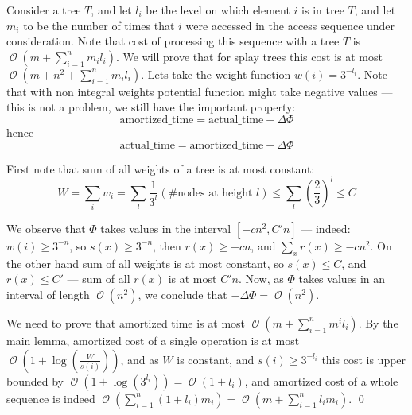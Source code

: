 \documentclass[11pt]{article}
\DeclareMathOperator*{\Oh}{\mathcal{O}}
\begin{document}
Consider a tree $T$, and let $l_i$ be the level on which element $i$ is in tree $T$, and let $m_i$ to be the number of times that $i$ were accessed in the access sequence under consideration.
Note that cost of processing this sequence with a tree $T$ is $\Oh(m + \sum_{i=1}^n m_i l_i)$. We will prove that for splay trees this cost is at most $\Oh(m + n^2 + \sum_{i=1}^n m_i l_i)$. Lets take the weight function $w(i) = 3^{-l_i}$. Note that with non integral weights potential function might take negative values --- this is not a problem, we still have the important property:
\begin{equation*}
\mathrm{amortized\_time} = \mathrm{actual\_time} + \Delta\Phi
\end{equation*}
hence
\begin{equation*}
\mathrm{actual\_time} = \mathrm{amortized\_time} - \Delta\Phi
\end{equation*}

First note that sum of all weights of a tree is at most constant:
\begin{equation*}
	W = \sum_{i} w_i = \sum_{l} \frac{1}{3^l} (\# \text{nodes at height }l) \leq \sum_l \left( \frac{2}{3} \right)^l \leq C
\end{equation*}

We observe that $\Phi$ takes values in the interval $[-c n^2, C' n]$ --- indeed: $w(i) \geq 3^{-n}$, so  $s(x) \geq 3^{-n}$, then $r(x) \geq -c n$, and $\sum_x r(x) \geq -c n^2$. On the other hand sum of all weights is at most constant, so $s(x) \leq C$, and $r(x) \leq C'$ --- sum of all $r(x)$ is at most $C' n$.  Now, as $\Phi$ takes values in an interval of length $\Oh(n^2)$, we conclude that $- \Delta\Phi = \Oh(n^2)$.

We need to prove that amortized time is at most $\Oh(m + \sum_{i=1}^n m^i l_i)$. By the main lemma, amortized cost of a single operation is at most $\Oh(1 + \log(\frac{W}{s(i)}))$, and as $W$ is constant, and $s(i) \geq 3^{-l_i}$ this cost is upper bounded by $\Oh(1 + \log(3^{l_i})) = \Oh(1+l_i)$, and amortized cost of a whole sequence is indeed $\Oh(\sum_{i=1}^n (1 + l_i) m_i) = \Oh(m + \sum_{i=1}^n l_i m_i)$.
\qed

{}

\end{document}
